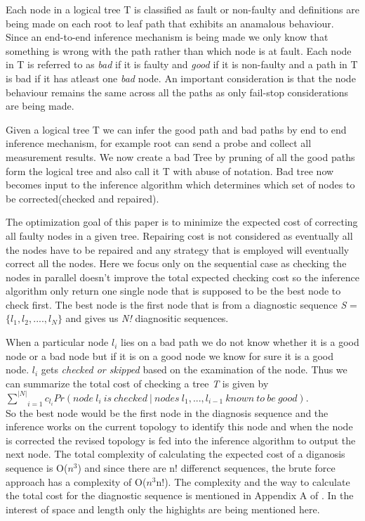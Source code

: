 \documentclass[10pt]{sigplan-proc-varsize}
\begin{document}
Each node in a logical tree T is classified as fault or non-faulty and definitions are being made on each root to leaf path that exhibits an anamalous behaviour. Since an end-to-end inference mechanism is being made we only know that something is wrong with the path rather than which node is at fault. Each node in T is referred to as {\it bad} if it is faulty and {\it good} if it is non-faulty and a path in T is bad if it has atleast one {\it bad} node. An important consideration is that the node behaviour remains the same across all the paths as only fail-stop considerations are being made. 

Given a logical tree T we can infer the good path and bad paths by end to end inference mechanism, for example root can send a probe and collect all measurement results. We now create a bad Tree by pruning of all the good paths form the logical tree and also call it T with abuse of notation. Bad tree now becomes input to the inference algorithm which determines which set of nodes to be corrected(checked and repaired).

The optimization goal of this paper is to minimize the expected cost of correcting all faulty nodes in a given tree. Repairing cost is not considered as eventually all the nodes have to be repaired and any strategy that is employed will eventually correct all the nodes. Here we focus only on the sequential case as checking the nodes in parallel doesn't improve the total expected checking cost so the inference algorithm only return one single node that is supposed to be the best node to check first. The best node is the first node that is from a diagnostic sequence {\it S} = $\{l_1,l_2,....,l_N\}$ and gives us {\it N!} diagnositic sequences.

When a particular node {\it $l_i$} lies on a bad path we do not know whether it is a good node or a bad node but if it is on a good node we know for sure it is a good node. {\it $l_i$}  gets {\it checked or skipped} based on the examination of the node. Thus we can summarize the total cost of checking a tree {\it T} is given by  \\
$\underset{i=1}{\overset{|N|}{\sum}} c_{l_i} Pr(node\ l_i\ is\ checked\ | \ nodes\ l_1,...,l_{i-1}\ known\ to\ be\ good).$ \\
So the best node would be the first node in the diagnosis sequence and the inference works on the current topology to identify this node and when the node is corrected the revised topology is fed into the inference algorithm to output the next node. The total complexity of calculating the expected cost of a diganosis sequence is O($n^3$) and since there are n! differenct sequences, the brute force approach has a complexity of O($n^3$n!). The complexity and the way to calculate the total cost for the diagnostic sequence is mentioned in Appendix A of \cite{pclee:07}. In the interest of space and length only the highights are being mentioned here.
\end{document}
